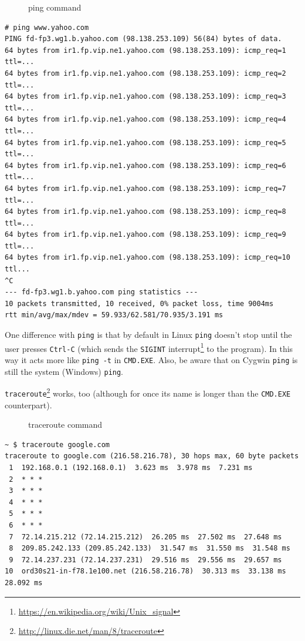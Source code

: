 \documentclass[10pt,]{book}
\renewcommand{\href}[2]{#2\footnote{\url{#1}}}
\numberwithin{figure}{chapter}
\DeclareRobustCommand{\drcap}[1]{\begin{figure}[H]\caption{#1}\end{figure}}
\DeclareRobustCommand{\drcmd}[1]{\index{Commands!#1}}
\DeclareRobustCommand{\drshl}[1]{\index{Shells!#1}}
\begin{document}
\drcap{ping command}

\begin{verbatim}
# ping www.yahoo.com
PING fd-fp3.wg1.b.yahoo.com (98.138.253.109) 56(84) bytes of data.
64 bytes from ir1.fp.vip.ne1.yahoo.com (98.138.253.109): icmp_req=1 ttl=...
64 bytes from ir1.fp.vip.ne1.yahoo.com (98.138.253.109): icmp_req=2 ttl=...
64 bytes from ir1.fp.vip.ne1.yahoo.com (98.138.253.109): icmp_req=3 ttl=...
64 bytes from ir1.fp.vip.ne1.yahoo.com (98.138.253.109): icmp_req=4 ttl=...
64 bytes from ir1.fp.vip.ne1.yahoo.com (98.138.253.109): icmp_req=5 ttl=...
64 bytes from ir1.fp.vip.ne1.yahoo.com (98.138.253.109): icmp_req=6 ttl=...
64 bytes from ir1.fp.vip.ne1.yahoo.com (98.138.253.109): icmp_req=7 ttl=...
64 bytes from ir1.fp.vip.ne1.yahoo.com (98.138.253.109): icmp_req=8 ttl=...
64 bytes from ir1.fp.vip.ne1.yahoo.com (98.138.253.109): icmp_req=9 ttl=...
64 bytes from ir1.fp.vip.ne1.yahoo.com (98.138.253.109): icmp_req=10 ttl...
^C
--- fd-fp3.wg1.b.yahoo.com ping statistics ---
10 packets transmitted, 10 received, 0% packet loss, time 9004ms
rtt min/avg/max/mdev = 59.933/62.581/70.935/3.191 ms
\end{verbatim}

One difference with \texttt{ping} is that by default in Linux
\texttt{ping} doesn't stop until the user presses \texttt{Ctrl-C} (which
sends the
\href{https://en.wikipedia.org/wiki/Unix_signal}{\texttt{SIGINT}
interrupt} to the program). In this way it acts more like
\texttt{ping -t} in \texttt{CMD.EXE}\drshl{CMD.EXE}. Also, be aware that
on Cygwin \texttt{ping} is still the system (Windows) \texttt{ping}.

\href{http://linux.die.net/man/8/traceroute}{\texttt{traceroute}}\drcmd{traceroute}
works, too (although for once its name is longer than the
\texttt{CMD.EXE} counterpart).

\drcap{traceroute command}

\begin{verbatim}
~ $ traceroute google.com
traceroute to google.com (216.58.216.78), 30 hops max, 60 byte packets
 1  192.168.0.1 (192.168.0.1)  3.623 ms  3.978 ms  7.231 ms
 2  * * *
 3  * * *
 4  * * *
 5  * * *
 6  * * *
 7  72.14.215.212 (72.14.215.212)  26.205 ms  27.502 ms  27.648 ms
 8  209.85.242.133 (209.85.242.133)  31.547 ms  31.550 ms  31.548 ms
 9  72.14.237.231 (72.14.237.231)  29.516 ms  29.556 ms  29.657 ms
10  ord30s21-in-f78.1e100.net (216.58.216.78)  30.313 ms  33.138 ms  28.092 ms
\end{verbatim}
\end{document}
